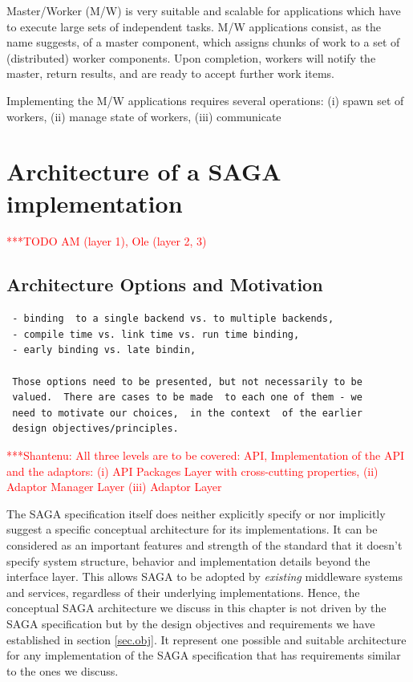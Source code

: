 \documentclass[a4paper,12pt]{article}
\newcommand{\todo}[1]{     {\textcolor{red}  { ***TODO      #1 }}}
\newcommand{\jhanote}[1]{  {\textcolor{red}  { ***Shantenu: #1 }}}
\newcommand{\todo}[1]{}
\newcommand{\jhanote}[1]{}
\begin{document}
   Master/Worker (M/W) is very suitable and scalable for applications
   which have to execute large sets of independent tasks.  M/W
   applications consist, as the name suggests, of a master component,
   which assigns chunks of work to a set of (distributed) worker
   components.  Upon completion, workers will notify the master, 
   return results, and are ready to accept further work items.

   Implementing the M/W applications requires several operations: (i)
   spawn set of workers, (ii) manage state of workers, (iii)
   communicate 
   


% 
\section{Architecture of a SAGA implementation} \todo{AM (layer 1), Ole (layer 2, 3)}
\label{sec.architecture}


\subsection{Architecture Options and Motivation}

\begin{verbatim}
 - binding  to a single backend vs. to multiple backends,
 - compile time vs. link time vs. run time binding,
 - early binding vs. late bindin,
 
 Those options need to be presented, but not necessarily to be 
 valued.  There are cases to be made  to each one of them - we 
 need to motivate our choices,  in the context  of the earlier 
 design objectives/principles.
\end{verbatim}

\jhanote{All three levels are to be covered: API, Implementation of
  the API and the adaptors: (i) API Packages Layer with cross-cutting
  properties, (ii) Adaptor Manager Layer (iii) Adaptor Layer}


The SAGA specification itself does neither explicitly specify or nor implicitly
suggest a specific conceptual architecture for its implementations. It can be
considered as an important features and strength of the standard that it
doesn't specify system structure, behavior and implementation details beyond
the interface layer. This allows SAGA to be adopted by \textit{existing}
middleware systems and services, regardless of their underlying
implementations.  Hence, the conceptual SAGA architecture we discuss in this
chapter is not driven by the SAGA specification but by the design objectives
and requirements we have established in section \ref{sec.obj}. It
represent one possible and suitable architecture for any implementation of
the SAGA specification that has requirements similar to the ones we discuss. 
\end{document}
